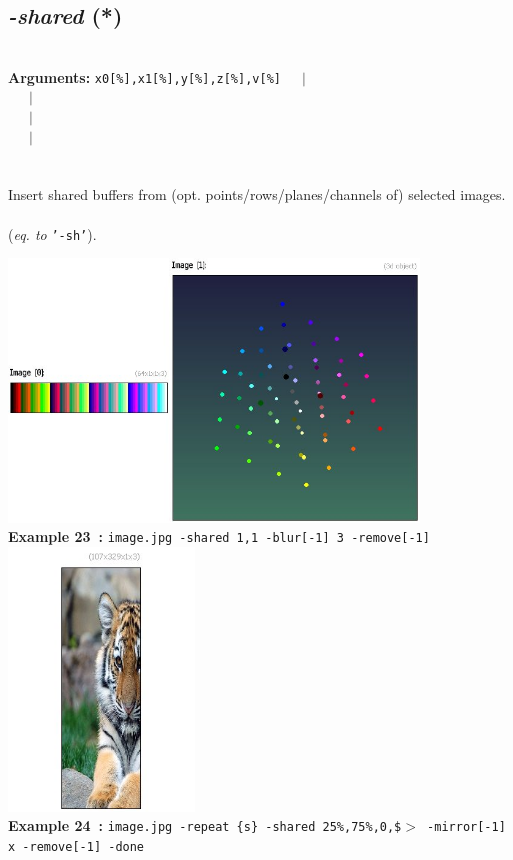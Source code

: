 \documentclass[a4paper,11pt,twoside]{book}
\begin{document}
\subsection{\emph{-shared} (*)}\vspace*{-0.5em}
~\\\textbf{Arguments: } 
{\small \texttt{x0[\%],x1[\%],y[\%],z[\%],v[\%]}}~~~$|$\\
~~~$|$\\
~~~$|$\\
~~~$|$\\
\\~\\
Insert shared buffers from (opt. points/rows/planes/channels of) selected images.
~\\(\emph{eq. to} {\small \texttt{'-sh'}}).
\begin{center}\includegraphics[keepaspectratio=true,height=7cm,width=\textwidth]{img/gmic_def23.jpg}\\
{\footnotesize \textbf{Example 23~:} \texttt{image.jpg -shared 1,1 -blur[-1] 3 -remove[-1]}}
\\\includegraphics[keepaspectratio=true,height=7cm,width=\textwidth]{img/gmic_def24.jpg}\\
{\footnotesize \textbf{Example 24~:} \texttt{image.jpg -repeat \{s\} -shared 25\%,75\%,0,\$$>$ -mirror[-1] x -remove[-1] -done}}
\end{center}
\end{document}
